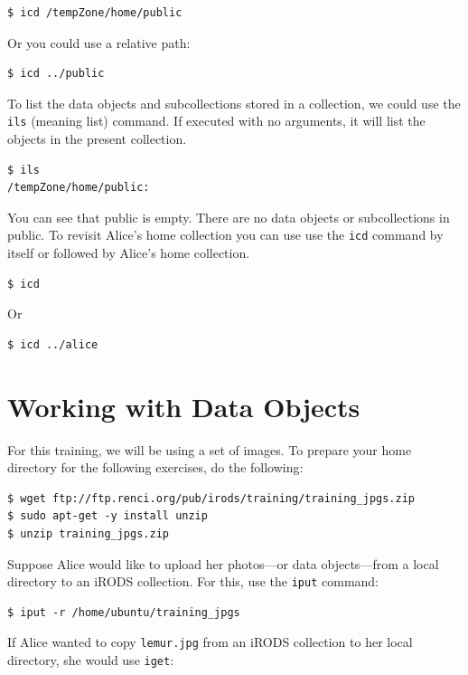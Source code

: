 \documentclass[10pt,oneside]{memoir}
\begin{document}
\begin{lstlisting}
$ icd /tempZone/home/public
\end{lstlisting}

Or you could use a relative path:

\begin{lstlisting}
$ icd ../public
\end{lstlisting}

To list the data objects and subcollections stored in a collection, we could use the \texttt{ils} (meaning list) command. If executed with no arguments, it will list the objects in the present collection.

\begin{lstlisting}
$ ils
/tempZone/home/public:
\end{lstlisting}

You can see that public is empty. There are no data objects or subcollections in public.
To revisit Alice's home collection you can use use the \texttt{icd} command by itself or followed by Alice's home collection.

\begin{lstlisting}
$ icd
\end{lstlisting}

Or

\begin{lstlisting}
$ icd ../alice
\end{lstlisting}

\section{Working with Data Objects}

For this training, we will be using a set of images. To prepare your home directory for the following exercises, do the following:

\begin{lstlisting}
$ wget ftp://ftp.renci.org/pub/irods/training/training_jpgs.zip
$ sudo apt-get -y install unzip
$ unzip training_jpgs.zip
\end{lstlisting}

Suppose Alice would like to upload her photos---or data objects---from a local directory to an iRODS collection. For this, use the \texttt{iput} command:

\begin{lstlisting}
$ iput -r /home/ubuntu/training_jpgs
\end{lstlisting}

If Alice wanted to copy \texttt{lemur.jpg} from an iRODS collection to her local directory, she would use \texttt{iget}:
\end{document}
